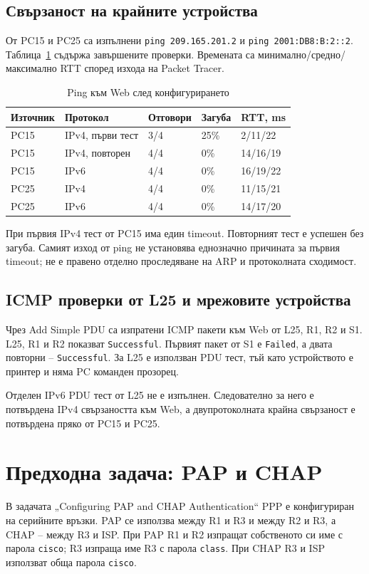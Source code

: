 \documentclass[12pt]{article}
\begin{document}
\subsection{Свързаност на крайните устройства}
От PC15 и PC25 са изпълнени \texttt{ping 209.165.201.2} и \texttt{ping 2001:DB8:B:2::2}. Таблица~\ref{tab:ping} съдържа завършените проверки. Времената са минимално/средно/максимално RTT според изхода на Packet Tracer.
\begin{table}[H]
\centering\small
\caption{Ping към Web след конфигурирането}
\label{tab:ping}
\begin{tabular}{lllll}
\toprule
Източник & Протокол & Отговори & Загуба & RTT, ms\\
\midrule
PC15 & IPv4, първи тест & 3/4 & 25\% & 2/11/22\\
PC15 & IPv4, повторен & 4/4 & 0\% & 14/16/19\\
PC15 & IPv6 & 4/4 & 0\% & 16/19/22\\
PC25 & IPv4 & 4/4 & 0\% & 11/15/21\\
PC25 & IPv6 & 4/4 & 0\% & 14/17/20\\
\bottomrule
\end{tabular}
\end{table}
При първия IPv4 тест от PC15 има един timeout. Повторният тест е успешен без загуба. Самият изход от ping не установява еднозначно причината за първия timeout; не е правено отделно проследяване на ARP и протоколната сходимост.

\subsection{ICMP проверки от L25 и мрежовите устройства}
Чрез Add Simple PDU са изпратени ICMP пакети към Web от L25, R1, R2 и S1. L25, R1 и R2 показват \texttt{Successful}. Първият пакет от S1 е \texttt{Failed}, а двата повторни -- \texttt{Successful}. За L25 е използван PDU тест, тъй като устройството е принтер и няма PC команден прозорец.

Отделен IPv6 PDU тест от L25 не е изпълнен. Следователно за него е потвърдена IPv4 свързаността към Web, а двупротоколната крайна свързаност е потвърдена пряко от PC15 и PC25.

\section{Предходна задача: PAP и CHAP}
В задачата „Configuring PAP and CHAP Authentication“ PPP е конфигуриран на серийните връзки. PAP се използва между R1 и R3 и между R2 и R3, а CHAP -- между R3 и ISP. При PAP R1 и R2 изпращат собственото си име с парола \texttt{cisco}; R3 изпраща име R3 с парола \texttt{class}. При CHAP R3 и ISP използват обща парола \texttt{cisco}.
\end{document}
